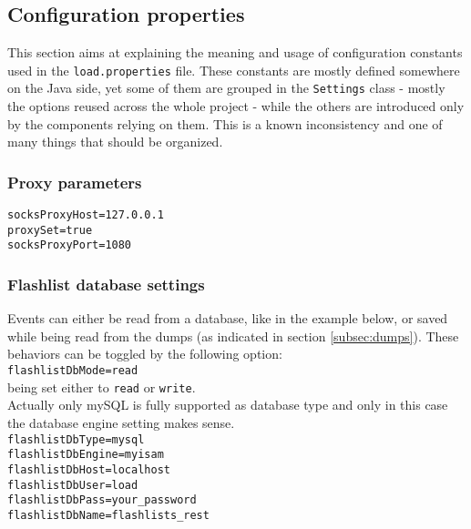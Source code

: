 
\subsection{Configuration properties}

This section aims at explaining the meaning and usage of configuration constants used in the \texttt{load.properties} file.
These constants are mostly defined somewhere on the Java side, yet some of them are grouped in the \texttt{Settings} class - mostly the options reused across the whole project - while the others are introduced only by the components relying on them. This is a known inconsistency and one of many things that should be organized.

\subsubsection{Proxy parameters}

\texttt{socksProxyHost=127.0.0.1} \\
\texttt{proxySet=true} \\
\texttt{socksProxyPort=1080} \\

\subsubsection{Flashlist database settings}

Events can either be read from a database, like in the example below, or saved while being read from the dumps (as indicated in section \ref{subsec:dumps}). These behaviors can be toggled by the following option: \\
\texttt{flashlistDbMode=read} \\
being set either to \texttt{read} or \texttt{write}. \\

Actually only mySQL is fully supported as database type and only in this case the database engine setting makes sense. \\
\texttt{flashlistDbType=mysql} \\
\texttt{flashlistDbEngine=myisam} \\

\texttt{flashlistDbHost=localhost} \\
\texttt{flashlistDbUser=load} \\
\texttt{flashlistDbPass=your\_password} \\
\texttt{flashlistDbName=flashlists\_rest} \\

